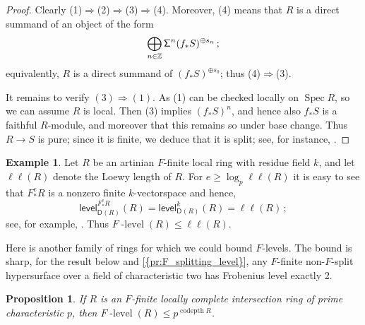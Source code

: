 \documentclass{amsart}
\newcommand{\dcat}[2][]{\cat{D}_{#1}(#2)}
\newcommand{\cat}[1]{{\mathsf{#1}}}
\newcommand{\codepth}{\operatorname{codepth}}
\newcommand{\flevel}{F\!\operatorname{-level}}
\newcommand{\level}{\mathsf{level}}
\newcommand{\shift}{{\sf\Sigma}}
\newcommand{\spec}{\operatorname{Spec}}
\newtheorem{proposition}[subsection]{Proposition}
\theoremstyle{definition}
\newtheorem{example}[subsection]{Example}
\theoremstyle{remark}
\numberwithin{equation}{subsection}
\begin{document}
\begin{proof}
Clearly (1)$\Rightarrow$(2)$\Rightarrow$(3)$\Rightarrow$(4). Moreover, (4) means that $R$ is a direct summand of an object of the form 
 \[
 \bigoplus_{n\in \mathbb{Z}} \shift^n (f_*S)^{\oplus s_n}\,;
 \]
equivalently,  $R$ is a direct summand of $(f_*S)^{\oplus s_0}$; thus (4)$\Rightarrow$(3). 

 It remains to verify $(3)\Rightarrow(1)$. As (1) can be checked locally on $\spec R$, so we can assume $R$ is local. Then (3) implies $(f_*S)^n$, and hence also $f_*S$ is a faithful $R$-module, and moreover that this remains so under base change. Thus $R\to S$ is pure; since it is finite, we deduce that it is split; see, for instance, \cite[Theorem~7.14]{Matsumura:1989}.
\end{proof}
 

\begin{example}
Let $R$ be an artinian $F$-finite local ring with residue field $k$, and let $\ell\ell(R)$ denote the Loewy length of $R$. For $e\ge \log_p\ell\ell(R)$ it is easy to see that $F_*^eR$ is a nonzero finite $k$-vectorspace and hence, 
\[
\level_{\dcat{R}}^{F_*^eR}(R)=\level_{\dcat{R}}^{k}(R)=\ell\ell(R)\,;
\]
see, for example, \cite[Theorem~6.2]{Avramov/Buchweitz/Iyengar/Miller:2010}. Thus $\flevel(R)\le \ell\ell(R)$.
\end{example}

Here is another family of rings for which we could bound $F$-levels. The bound is sharp, for the result below and \cref{{pr:F_splitting_level}}, any $F$-finite non-$F$-split hypersurface over a field of characteristic two has Frobenius level exactly 2. 

\begin{proposition}
\label{th:flevel_lci}
If $R$ is an $F$-finite locally complete intersection ring of prime characteristic $p$, then 
$\flevel(R)\le p^{\codepth R}$.
\end{proposition}
\end{document}
